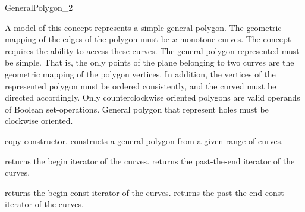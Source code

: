 \ccRefPageBegin

\begin{ccRefConcept}{GeneralPolygon_2}

\ccRefines

\ccTypes


\ccGlue
{}
 
\ccDefinition
A model of this concept represents a simple general-polygon. The
geometric mapping of the edges of the polygon must be $x$-monotone curves.
The concept requires the ability to access these curves. 
The general polygon represented must be simple. That is, the
only points of the plane belonging to two curves are the geometric mapping
of the polygon vertices. In addition, the vertices of the represented 
polygon must be ordered consistently, and the curved must be directed 
accordingly. Only counterclockwise oriented polygons are valid operands
of Boolean set-operations. General polygon that represent holes must be
clockwise oriented.

\ccCreation
{}

\ccThreeToTwo

\ccGlue
{}
{copy constructor.}
\ccGlue
{}
\ccGlue
{}
{constructs a general polygon from a given range of curves.}

\ccAccessFunctions

{returns the begin iterator of the curves.}
\ccGlue
{} 
{returns the past-the-end iterator of the curves.}

{returns the begin const iterator of the curves.}
\ccGlue
{} 
{returns the past-the-end const iterator of the curves.}


\end{ccRefConcept}
